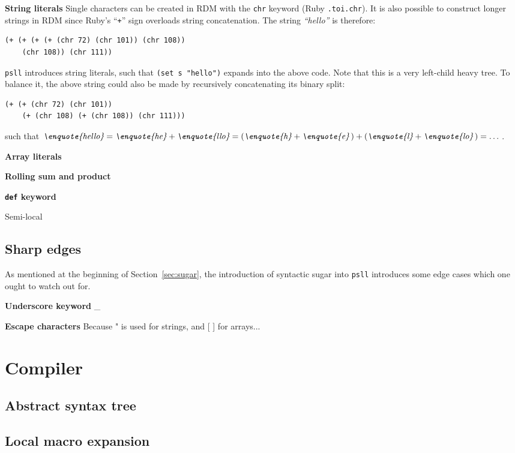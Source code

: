 \documentclass[aip,jcp,reprint]{revtex4-1}
\let\tt\texttt
\newcommand\psll{\texttt{psll}\xspace}
\newcommand{\ilpsll}[1]{\lstinline[language=psll,columns=flexible]{#1}}
\begin{document}
\textbf{String literals} Single characters can be created in RDM with the \tt{chr} keyword (Ruby \tt{.to\textunderscore{}i.chr}). It is also possible to construct longer strings in RDM since Ruby's \enquote{\tt{+}} sign overloads string concatenation. The string \textit{\enquote{hello}} is therefore:
\begin{lstlisting}[language=psll,aboveskip=3pt,belowskip=-2pt]
(+ (+ (+ (+ (chr 72) (chr 101)) (chr 108))
	(chr 108)) (chr 111))
\end{lstlisting}
\psll introduces string literals, such that \ilpsll{(set s "hello")} expands into the above code. Note that this is a very left-child heavy tree. To balance it, the above string could also be made by recursively concatenating its binary split:
\begin{lstlisting}[language=psll,aboveskip=3pt,belowskip=-2pt]
(+ (+ (chr 72) (chr 101))
	(+ (chr 108) (+ (chr 108)) (chr 111)))
\end{lstlisting}
such that $\textit{\enquote{hello}} = \textit{\enquote{he}} + \textit{\enquote{llo}} = \left(\textit{\enquote{h}} + \textit{\enquote{e}}\,\right) + \left(\textit{\enquote{l}} + \textit{\enquote{lo}}\,\right) = \dots$.

\textbf{Array literals}

\textbf{Rolling sum and product}

\textbf{\tt{def} keyword}

Semi-local

\subsection{Sharp edges}\label{sec:sharp_edges}
As mentioned at the beginning of Section~\ref{sec:sugar}, the introduction of syntactic sugar into \psll introduces some edge cases which one ought to watch out for.

\textbf{Underscore keyword}
\_

\textbf{Escape characters}
Because " is used for strings, and [ ] for arrays...

\section{Compiler}
\subsection{Abstract syntax tree}
\subsection{Local macro expansion}\label{sec:macros}
\end{document}
